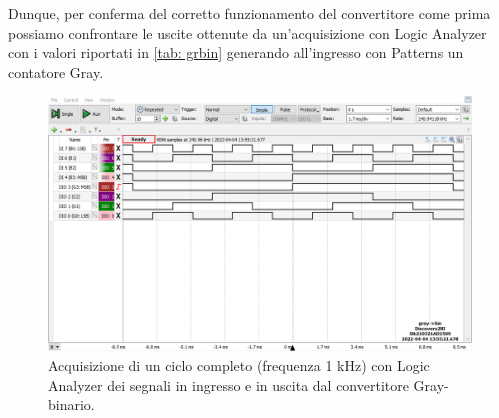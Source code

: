 \documentclass[10pt, a4paper, italian]{article}
\begin{document}
Dunque, per conferma del corretto funzionamento del convertitore come prima
possiamo confrontare le uscite ottenute da un'acquisizione con Logic Analyzer
con i valori riportati in \cref{tab: grbin} generando all'ingresso con
Patterns un contatore Gray.
\begin{figure}[htbp]
    \centering
    \includegraphics[width=\textwidth]{graybin}
    \caption{Acquisizione di un ciclo completo (frequenza 1 kHz) con Logic
    Analyzer dei segnali in ingresso e in uscita dal convertitore Gray-binario.}
\end{figure}
\end{document}
